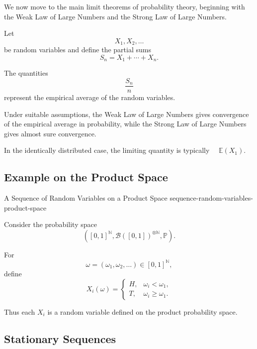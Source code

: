 We now move to the main limit theorems of probability theory,
beginning with the Weak Law of Large Numbers and the Strong Law of
Large Numbers.

Let
\[
X_1,X_2,\ldots
\]
be random variables and define the partial sums
\[
S_n
=
X_1+\cdots+X_n.
\]

The quantities
\[
\frac{S_n}{n}
\]
represent the empirical average of the random variables.

\begin{observation}

Under suitable assumptions, the Weak Law of Large Numbers gives
convergence of the empirical average in probability, while the Strong
Law of Large Numbers gives almost sure convergence.

In the identically distributed case, the limiting quantity is
typically
\(
\quad\mathbb{E}(X_1).
\)

\end{observation}



\subsection{Example on the Product Space}

\begin{example}{A Sequence of Random Variables on a Product Space}
{sequence-random-variables-product-space}

Consider the probability space
\[
\left(
[0,1]^{\mathbb{N}},
\mathcal{B}([0,1])^{\otimes\mathbb{N}},
\mathbb{P}
\right).
\]

For
\[
\omega=(\omega_1,\omega_2,\ldots)
\in[0,1]^{\mathbb{N}},
\]
define
\[
X_i(\omega)
=
\begin{cases}
H, & \omega_i<\omega_1,\\[4pt]
T, & \omega_i\geq\omega_1.
\end{cases}
\]

Thus each $X_i$ is a random variable defined on the product
probability space.

\end{example}



\subsection{Stationary Sequences}

